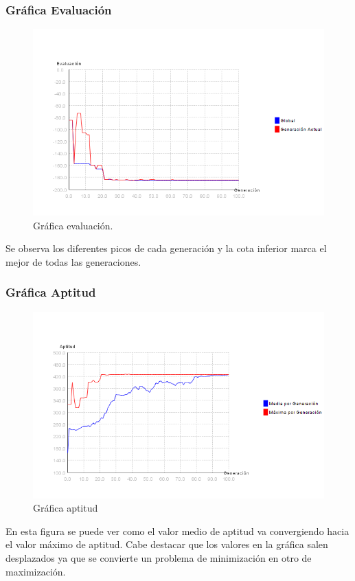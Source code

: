 \documentclass[12pt]{article}
\begin{document}
\subsubsection*{Gráfica Evaluación}
\begin{figure}[H]
\centering
\includegraphics[scale=0.4]{graficas/F4inicial_algoritmo}
\caption{Gráfica evaluación.}
\label{fig}
\end{figure}
	Se observa los diferentes picos de cada generación y la cota inferior marca el mejor de todas las generaciones.

\subsubsection*{Gráfica Aptitud}
\begin{figure}[H]
\centering
\includegraphics[scale=0.4]{graficas/F4inicial_aptitud}
\caption{Gráfica aptitud}
\label{fig}
\end{figure}
	En esta figura se puede ver como el valor medio de aptitud va convergiendo hacia el valor máximo de aptitud. Cabe destacar que los valores en la gráfica salen desplazados ya que se convierte un problema de minimización en otro de maximización.
\end{document}
